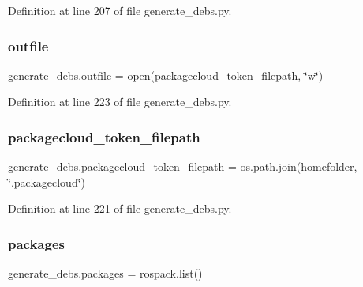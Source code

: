 Definition at line 207 of file generate\+\_\+debs.\+py.

\mbox{\label{namespacegenerate__debs_aa1faa039b35b72ee44dc6f106ad12911}} 
\subsubsection{\texorpdfstring{outfile}{outfile}}
{\footnotesize\ttfamily generate\+\_\+debs.\+outfile = open(\hyperlink{namespacegenerate__debs_a836a20b989c3c8e46255d91d10cb524f}{packagecloud\+\_\+token\+\_\+filepath}, \char`\"{}w\char`\"{})}



Definition at line 223 of file generate\+\_\+debs.\+py.

\mbox{\label{namespacegenerate__debs_a836a20b989c3c8e46255d91d10cb524f}} 
\subsubsection{\texorpdfstring{packagecloud\+\_\+token\+\_\+filepath}{packagecloud\_token\_filepath}}
{\footnotesize\ttfamily generate\+\_\+debs.\+packagecloud\+\_\+token\+\_\+filepath = os.\+path.\+join(\hyperlink{namespacegenerate__debs_aeb83979be2939a8059435a906a91f682}{homefolder}, \char`\"{}.packagecloud\char`\"{})}



Definition at line 221 of file generate\+\_\+debs.\+py.

\mbox{\label{namespacegenerate__debs_a40d4732827c5678f3f48354238245e1d}} 
\subsubsection{\texorpdfstring{packages}{packages}}
{\footnotesize\ttfamily generate\+\_\+debs.\+packages = rospack.\+list()}




